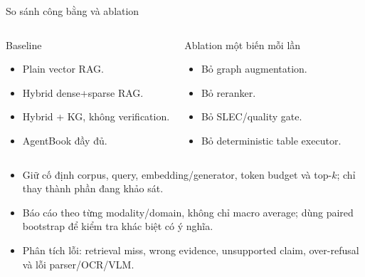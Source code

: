 \documentclass[aspectratio=169,11pt]{beamer}
\begin{document}
\begin{frame}{So sánh công bằng và ablation}
\small
\begin{columns}[T,onlytextwidth]
\begin{block}{Baseline}
\begin{itemize}
  \item Plain vector RAG.
  \item Hybrid dense+sparse RAG.
  \item Hybrid + KG, không verification.
  \item AgentBook đầy đủ.
\end{itemize}
\end{block}
\begin{block}{Ablation một biến mỗi lần}
\begin{itemize}
  \item Bỏ graph augmentation.
  \item Bỏ reranker.
  \item Bỏ SLEC/quality gate.
  \item Bỏ deterministic table executor.
\end{itemize}
\end{block}
\end{columns}
\vspace{0.15cm}
\begin{itemize}
  \item Giữ cố định corpus, query, embedding/generator, token budget và top-$k$; chỉ thay thành phần đang khảo sát.
  \item Báo cáo theo từng modality/domain, không chỉ macro average; dùng paired bootstrap để kiểm tra khác biệt có ý nghĩa.
  \item Phân tích lỗi: retrieval miss, wrong evidence, unsupported claim, over-refusal và lỗi parser/OCR/VLM.
\end{itemize}
\end{frame}
\end{document}
